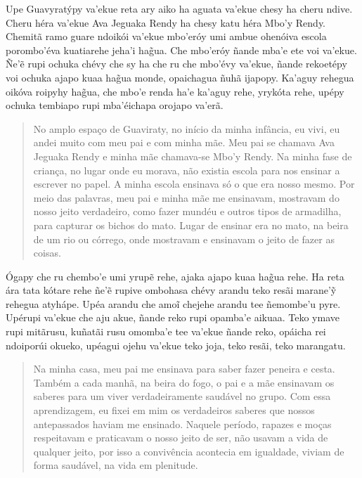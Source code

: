 \begin{itemize}
Upe Guavyratýpy va'ekue reta ary aiko ha aguata va'ekue chesy ha cheru
ndive. Cheru héra va'ekue Ava Jeguaka Rendy ha chesy katu héra Mbo'y
Rendy. Chemitã ramo guare ndoikói va'ekue mbo'eróy umi ambue ohenóiva
escola porombo'éva kuatiarehe jeha'i hag̃ua. Che mbo'eróy ñande mba'e ete
voi va'ekue. Ñe'ẽ rupi ochuka chévy che sy ha che ru che mbo'évy
va'ekue, ñande rekoetépy voi ochuka ajapo kuaa hag̃ua monde, opaichagua
ñuhã ijapopy. Ka'aguy rehegua oikóva roipyhy hag̃ua, che mbo'e renda ha'e
ka'aguy rehe, yrykóta rehe, upépy ochuka tembiapo rupi mba'éichapa
orojapo va'erã.

\begin{quote}
No amplo espaço de Guaviraty, no início da minha infância, eu vivi, eu
andei muito com meu pai e com minha mãe. Meu pai se chamava Ava Jeguaka
Rendy e minha mãe chamava-se Mbo'y Rendy. Na minha fase de criança, no
lugar onde eu morava, não existia escola para nos ensinar a escrever no
papel. A minha escola ensinava só o que era nosso mesmo. Por meio das
palavras, meu pai e minha mãe me ensinavam, mostravam do nosso jeito
verdadeiro, como fazer mundéu e outros tipos de armadilha, para capturar
os bichos do mato. Lugar de ensinar era no mato, na beira de um rio ou
córrego, onde mostravam e ensinavam o jeito de fazer as coisas.
\end{quote}

Ógapy che ru chembo'e umi yrupẽ rehe, ajaka ajapo kuaa hag̃ua rehe. Ha
reta ára tata kótare rehe ñe'ẽ rupive ombohasa chévy arandu teko resãi
marane'ỹ rehegua atyhápe. Upéa arandu che amoĩ chejehe arandu tee
ñemombe'u pyre. Upérupi va'ekue che aju akue, ñande reko rupi opamba'e
aikuaa. Teko ymave rupi mitãrusu, kuñatãi rusu omomba'e tee va'ekue
ñande reko, opáicha rei ndoiporúi okueko, upéagui ojehu va'ekue teko
joja, teko resãi, teko marangatu.

\begin{quote}
Na minha casa, meu pai me ensinava para saber fazer peneira e cesta.
Também a cada manhã, na beira do fogo, o pai e a mãe ensinavam os
saberes para um viver verdadeiramente saudável no grupo. Com essa
aprendizagem, eu fixei em mim os verdadeiros saberes que nossos
antepassados haviam me ensinado. Naquele período, rapazes e moças
respeitavam e praticavam o nosso jeito de ser, não usavam a vida de
qualquer jeito, por isso a convivência acontecia em igualdade, viviam de
forma saudável, na vida em plenitude.
\end{quote}


\end{itemize}
